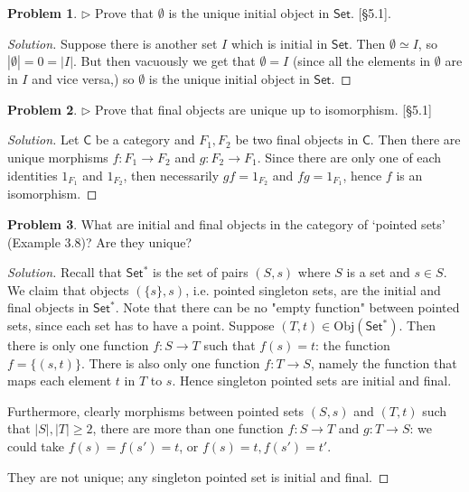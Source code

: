 \documentclass[fontsize=14pt]{scrartcl}
\theoremstyle{definition}
\newtheorem{problem-internal}{Problem}[subsection]
\newenvironment{problem}{
  \medskip
  \begin{problem-internal}
}{
  \end{problem-internal}
}
\newenvironment{solution}{
  \begin{proof}[Solution]
  \vspace{-8px}
  \setlength{\parskip}{4px}
  \setlength{\parindent}{0px}
}{
  \end{proof}
}
\newcommand{\Obj}{\mathrm{Obj}}
\newcommand{\abs}[1]{\left|#1\right|}
\begin{document}
\begin{problem}
\def \Set {\mathsf{Set}}
$\rhd$ Prove that $\emptyset$ is the unique initial object in $\Set$. [\S 5.1].
\end{problem}
\begin{solution}
\def \Set {\mathsf{Set}}
Suppose there is another set $I$ which is initial in $\Set$. Then
$\emptyset\simeq I$, so $\abs{\emptyset} = 0 = \abs{I}$. But then vacuously we
get that $\emptyset = I$ (since all the elements in $\emptyset$ are in $I$ and
vice versa,) so $\emptyset$ is the unique initial object in $\Set$.
\end{solution}


\begin{problem}
$\rhd$ Prove that final objects are unique up to isomorphism. [\S 5.1]
\end{problem}
\begin{solution}
\def \C {\mathsf{C}}
Let $\C$ be a category and $F_1,F_2$ be two final objects in $\C$. Then there
are unique morphisms $f:F_1\to F_2$ and $g:F_2\to F_1$. Since there are only one
of each identities $1_{F_1}$ and $1_{F_2}$, then necessarily $gf = 1_{F_2}$ and
$fg = 1_{F_1}$, hence $f$ is an isomorphism.
\end{solution}


\begin{problem}
What are initial and final objects in the category of `pointed sets' (Example
3.8)? Are they unique?
\end{problem}
\begin{solution}
\def \Set {\mathsf{Set}}
\def \SetS {\mathsf{{Set^*}}}
Recall that $\SetS$ is the set of pairs $(S,s)$ where $S$ is a set and $s\in S$.
We claim that objects $(\{s\},s)$, i.e. pointed singleton sets, are the initial
and final objects in $\SetS$. Note that there can be no "empty function" between
pointed sets, since each set has to have a point. Suppose $(T,t)\in\Obj(\SetS)$.
Then there is only one function $f:S\to T$ such that $f(s)=t$: the function
$f=\{(s,t)\}$. There is also only one function $f:T\to S$, namely the function
that maps each element $t$ in $T$ to $s$. Hence singleton pointed sets are
initial and final.

Furthermore, clearly morphisms between pointed sets $(S,s)$ and $(T,t)$ such
that $\abs{S},\abs{T}\geq 2$, there are more than one function $f:S\to T$ and
$g:T\to S$: we could take $f(s)=f(s')=t$, or $f(s)=t,f(s')=t'$.

They are not unique; any singleton pointed set is initial and final.
\end{solution}
\end{document}
